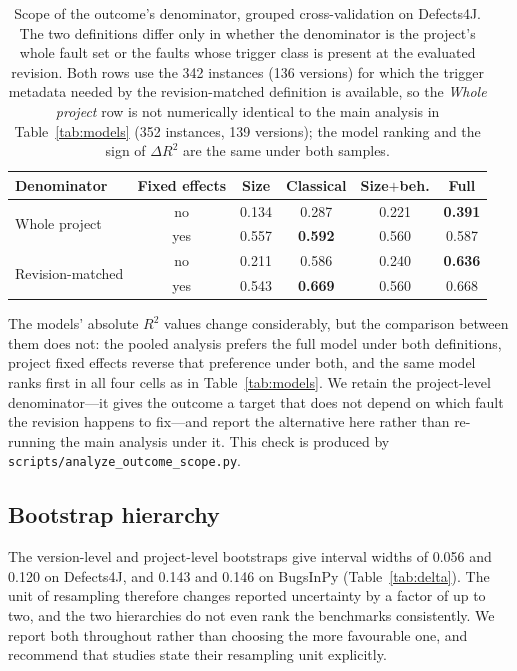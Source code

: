 \documentclass[preprint,12pt]{elsarticle}
\begin{document}
\begin{table}[t]
\centering
\caption{Scope of the outcome's denominator, grouped cross-validation on
Defects4J. The two definitions differ only in whether the denominator is the
project's whole fault set or the faults whose trigger class is present at the
evaluated revision. Both rows use the \num{342} instances (\num{136}
versions) for which the trigger metadata needed by the revision-matched
definition is available, so the \emph{Whole project} row is not numerically
identical to the main analysis in Table~\ref{tab:models} (\num{352}
instances, \num{139} versions); the model ranking and the sign of
$\Delta R^2$ are the same under both samples.}
\label{tab:scope}
\begin{tabular}{lccccc}
\toprule
Denominator & Fixed effects & Size & Classical & Size$+$beh. & Full \\
\midrule
\multirow{2}{*}{Whole project}
 & no  & 0.134 & 0.287 & 0.221 & \textbf{0.391} \\
 & yes & 0.557 & \textbf{0.592} & 0.560 & 0.587 \\
\midrule
\multirow{2}{*}{Revision-matched}
 & no  & 0.211 & 0.586 & 0.240 & \textbf{0.636} \\
 & yes & 0.543 & \textbf{0.669} & 0.560 & 0.668 \\
\bottomrule
\end{tabular}
\end{table}

The models' absolute $R^2$ values change considerably, but the comparison
between them does not: the pooled analysis prefers the full model under both
definitions, project fixed effects reverse that preference under both, and
the same model ranks first in all four cells as in
Table~\ref{tab:models}. We retain the project-level denominator---it gives
the outcome a target that does not depend on which fault the revision
happens to fix---and report the alternative here rather than re-running the
main analysis under it. This check is produced by
\texttt{scripts/analyze\_outcome\_scope.py}.

\subsection{Bootstrap hierarchy}

The version-level and project-level bootstraps give interval widths of
\num{0.056} and \num{0.120} on Defects4J, and \num{0.143} and \num{0.146}
on BugsInPy (Table~\ref{tab:delta}). The unit of resampling therefore
changes reported uncertainty by a factor of up to two, and the
two hierarchies do not even rank the benchmarks consistently. We report
both throughout rather than choosing the more favourable one, and
recommend that studies state their resampling unit explicitly.
\end{document}
